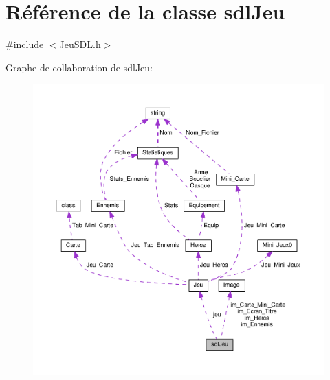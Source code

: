 \hypertarget{classsdlJeu}{\section{Référence de la classe sdl\+Jeu}
\label{classsdlJeu}
}


{\ttfamily \#include $<$Jeu\+S\+D\+L.\+h$>$}



Graphe de collaboration de sdl\+Jeu\+:\nopagebreak
\begin{figure}[H]
\begin{center}
\leavevmode
\includegraphics[width=350pt]{classsdlJeu__coll__graph}
\end{center}
\end{figure}
